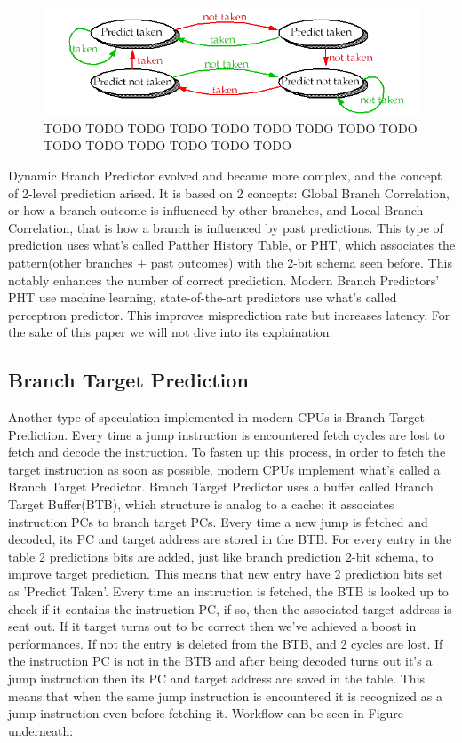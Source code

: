 \begin{figure}
    \includegraphics[scale=0.35]{img/2bitBHT.png}
    \caption{TODO TODO TODO TODO TODO TODO TODO TODO TODO TODO TODO TODO TODO TODO TODO }
\end{figure}

Dynamic Branch Predictor evolved and became more complex, and the concept of 2-level prediction arised. It is based on 2 concepts: Global Branch Correlation, or how a branch outcome is influenced by other branches, and Local Branch Correlation, that is how a branch is influenced by past predictions. This type of prediction uses what's called Patther History Table, or PHT, which associates the pattern(other branches + past outcomes) with the 2-bit schema seen before. This notably enhances the number of correct prediction.
Modern Branch Predictors' PHT use machine learning, state-of-the-art predictors use what's called perceptron predictor. This improves misprediction rate but increases latency. For the sake of this paper we will not dive into its explaination.

\subsection{Branch Target Prediction}
Another type of speculation implemented in modern CPUs is Branch Target Prediction.
Every time a jump instruction is encountered fetch cycles are lost to fetch and decode the instruction.
To fasten up this process, in order to fetch the target instruction as soon as possible, modern CPUs implement what's called a Branch Target Predictor.
Branch Target Predictor uses a buffer called Branch Target Buffer(BTB), which structure is analog to a cache: it associates instruction PCs to branch target PCs. Every time a new jump is fetched and decoded, its PC and target address are stored in the BTB.
For every entry in the table 2 predictions bits are added, just like branch prediction 2-bit schema, to improve target prediction.
This means that new entry have 2 prediction bits set as 'Predict Taken'.
Every time an instruction is fetched, the BTB is looked up to check if it contains the instruction PC, if so, then the associated target address is sent out.
If it target turns out to be correct then we've achieved a boost in performances.
If not the entry is deleted from the BTB, and 2 cycles are lost.
If the instruction PC is not in the BTB and after being decoded turns out it's a jump instruction then its PC and target address are saved in the table.
This means that when the same jump instruction is encountered it is recognized as a jump instruction even before fetching it.
Workflow can be seen in Figure underneath:

